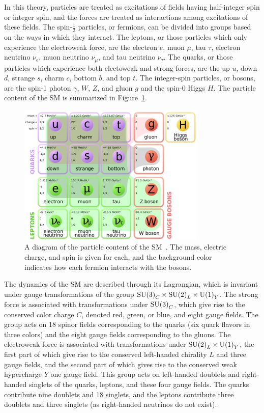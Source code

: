 In this theory, particles are treated as excitations of fields having half-integer spin or
integer spin, and the forces are treated as interactions among excitations of these fields.
The spin-$\frac{1}{2}$ particles, or fermions, can be divided into groups based on the ways
in which they interact. The leptons, or those particles which only experience the electroweak force,
are the electron $e$, muon $\mu$, tau $\tau$, electron neutrino $\nu_e$, muon neutrino $\nu_\mu$, and
tau neutrino $\nu_\tau$. The quarks, or those particles which experience both electoweak and strong
forces, are the up $u$, down $d$, strange $s$, charm $c$, bottom $b$, and top $t$. The integer-spin
particles, or bosons, are the spin-1 photon $\gamma$, $W$, $Z$, and gluon $g$ and the spin-0 Higgs $H$.
The particle content of the SM is summarized in Figure~\ref{fig:SMtable}.

\begin{figure}[ht]
 \begin{center}
    \includegraphics[width=0.80\textwidth]{figures/intro/Standard_Model_of_Elementary_Particles_modified_version.pdf}
      \end{center}
\caption{A diagram of the particle content of the SM~\cite{SMdiagram}.
The mass, electric charge, and spin is given for each, and the background color indicates how each
fermion interacts with the bosons.}
\label{fig:SMtable}
\end{figure}

The dynamics of the SM are described through its Lagrangian, which is invariant under
gauge transformations of the group ${\rm SU(3)}_C \times {\rm SU(2)}_L \times {\rm U(1)}_Y$.
The strong force is associated with transformations under ${\rm SU(3)}_C$, which give rise to
the conserved color charge $C$, denoted red, green, or blue, and eight gauge fields.
The group acts on 18 spinor fields corresponding to the quarks (six quark flavors in three colors)
and the eight gauge fields corresponding to the gluons.
The electroweak force is associated with transformations under ${\rm SU(2)}_L \times {\rm U(1)}_Y$,
the first part of which give rise to the conserved left-handed chirality $L$ and three gauge fields,
and the second part of which gives rise to the conserved weak hypercharge $Y$ one gauge field.
This group acts on left-handed doublets and right-handed singlets of the quarks, leptons, and
these four gauge fields. The quarks contribute nine doublets and 18 singlets, and the leptons contribute
three doublets and three singlets (as right-handed neutrinos do not exist).

